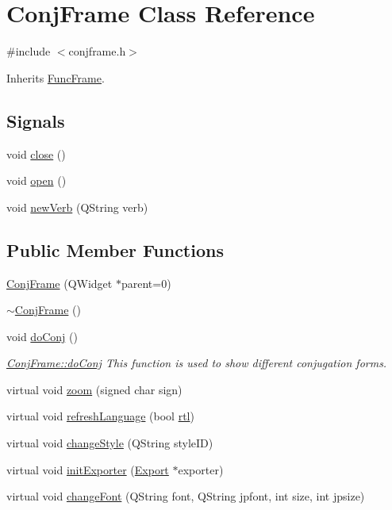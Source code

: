\hypertarget{class_conj_frame}{}\section{Conj\+Frame Class Reference}
\label{class_conj_frame}


{\ttfamily \#include $<$conjframe.\+h$>$}



Inherits \hyperlink{class_func_frame}{Func\+Frame}.

\subsection*{Signals}
\begin{DoxyCompactItemize}
\item 
void \hyperlink{class_conj_frame_a4d054c6581f6038fc340e3b28c197120}{close} ()
\item 
void \hyperlink{class_conj_frame_a537f0460a54225d55949d6b0da7a0da7}{open} ()
\item 
void \hyperlink{class_conj_frame_ae6de44e9ee2529edcaed75e740d08537}{new\+Verb} (Q\+String verb)
\end{DoxyCompactItemize}
\subsection*{Public Member Functions}
\begin{DoxyCompactItemize}
\item 
\hyperlink{class_conj_frame_ac436ead1700ab792d2d8b59b89559557}{Conj\+Frame} (Q\+Widget $\ast$parent=0)
\item 
\hyperlink{class_conj_frame_aa416dd801ddd8c36bb160840ecae050f}{$\sim$\+Conj\+Frame} ()
\item 
void \hyperlink{class_conj_frame_a873131af43e9f81162a1881bf8ae9606}{do\+Conj} ()
\begin{DoxyCompactList}\small\item\em \hyperlink{class_conj_frame_a873131af43e9f81162a1881bf8ae9606}{Conj\+Frame\+::do\+Conj} This function is used to show different conjugation forms. \end{DoxyCompactList}\item 
virtual void \hyperlink{class_conj_frame_ad02a4547f6ec085bbf5569ccabcb1cc6}{zoom} (signed char sign)
\item 
virtual void \hyperlink{class_conj_frame_a54d19035527d1e0f556fdcbbad5a5abb}{refresh\+Language} (bool \hyperlink{class_func_frame_a9afcf2865055116446b9f50406bb1c12}{rtl})
\item 
virtual void \hyperlink{class_conj_frame_ae9be73faedec7fa1305406b9a2866669}{change\+Style} (Q\+String style\+ID)
\item 
virtual void \hyperlink{class_conj_frame_a860983e19318724a7590ec400816c7aa}{init\+Exporter} (\hyperlink{class_export}{Export} $\ast$exporter)
\item 
virtual void \hyperlink{class_conj_frame_a03eeb5ba6a8583f28d6b12903efcc8a1}{change\+Font} (Q\+String font, Q\+String jpfont, int size, int jpsize)
\end{DoxyCompactItemize}
